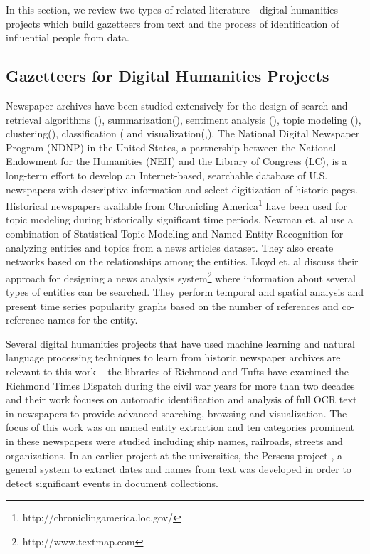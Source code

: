 In this section, we review two types of related literature - digital humanities projects which build gazetteers from text and the process of identification of influential people from data.

\subsection{Gazetteers for Digital Humanities Projects}
Newspaper archives have been studied extensively for the design of search and retrieval algorithms (\cite{Shahaf_11, Gabrilovich_04a, Alonso_10, Khurdiya_11}), summarization(\cite{McKeown95, Otterbacher06, Radev97, Radev01, Radev05}), sentiment analysis (\cite{balahur2009rethinking, godbole2007large, li2014sentiment}), topic modeling (\cite{Masand_92, Nallapati_04a, Radev99c, au2011studying, lee2010topic}), clustering(\cite{dutta2011learning}), classification (\cite{dutta2012using} and visualization(\cite{torget2011mapping},\cite{southall2014pastplace}). The National Digital Newspaper Program (NDNP) in the United States, a partnership between the National Endowment for the Humanities (NEH) and the Library of Congress (LC), is a long-term effort to develop an Internet-based, searchable database of U.S. newspapers with descriptive information and select digitization of historic pages. Historical newspapers available from Chronicling America\footnote{http://chroniclingamerica.loc.gov/} have been used for topic modeling during historically significant time periods\cite{yang2011topic}. Newman et. al\cite{newman2006analyzing} use a combination of Statistical Topic Modeling and Named Entity Recognition for analyzing entities and topics from a news articles dataset. They also create networks based on the relationships among the entities.
Lloyd et. al \cite{lloyd2005lydia} discuss their approach for designing a news analysis system\footnote{http://www.textmap.com} where information about several types of entities can be searched. They perform temporal and spatial analysis and present time series popularity graphs based on the number of references and co-reference names for the entity. %

Several digital humanities projects that have used machine learning and natural language processing techniques to learn from historic newspaper archives are relevant to this work -- the libraries of Richmond and Tufts have examined the Richmond Times Dispatch during the civil war years for more than two decades and their work focuses on automatic identification and analysis of full OCR text in newspapers to provide advanced searching, browsing and visualization\cite{crane2006challenge}. The focus of this work was on named entity extraction and ten categories prominent in these newspapers were studied including ship names, railroads, streets and organizations. In an earlier project at the universities, the Perseus project \cite{smith2002detectinga, smith2002detectingb, smith2001disambiguating}, a general system to extract dates and names from text was developed in order to detect significant events in document collections. 

